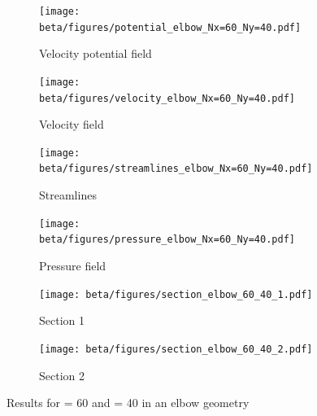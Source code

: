 \begin{figure}[htbp]
      \centering
      \begin{subfigure}{.45\textwidth}
            \texttt{[image: beta/figures/potential\_elbow\_Nx=60\_Ny=40.pdf]}
            \caption{Velocity potential field}
      \end{subfigure}
      \begin{subfigure}{.45\textwidth}
            \texttt{[image: beta/figures/velocity\_elbow\_Nx=60\_Ny=40.pdf]}
            \caption{Velocity field}
      \end{subfigure}

      \begin{subfigure}{.45\textwidth}
            \texttt{[image: beta/figures/streamlines\_elbow\_Nx=60\_Ny=40.pdf]}
            \caption{Streamlines}
      \end{subfigure}
      \begin{subfigure}{.45\textwidth}
            \texttt{[image: beta/figures/pressure\_elbow\_Nx=60\_Ny=40.pdf]}
            \caption{Pressure field}
      \end{subfigure}

      \begin{subfigure}{.45\textwidth}
            \texttt{[image: beta/figures/section\_elbow\_60\_40\_1.pdf]}
            \caption{Section 1}
      \end{subfigure}
      \begin{subfigure}{.45\textwidth}
            \texttt{[image: beta/figures/section\_elbow\_60\_40\_2.pdf]}
            \caption{Section 2}
      \end{subfigure}
      \caption{Results for  = \num{60} and  = \num{40} in an elbow geometry}
\end{figure}

\newpage

